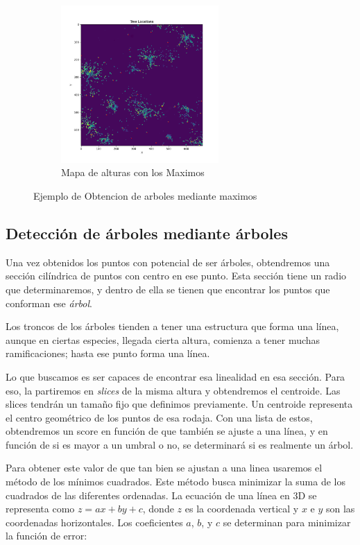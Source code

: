 \begin{figure}[h]
\begin{subfigure}[t]{.4\textwidth}
  \centering
  \includegraphics[height=6cm]{imaxes/chm_with_trees.png}
  \caption{Mapa de alturas con los Maximos}
  \label{fig:chm_max}
\end{subfigure}

\caption{Ejemplo de Obtencion de arboles mediante maximos}
\label{fig:chmexample}
\end{figure}

\subsection{Detección de árboles mediante árboles}

Una vez obtenidos los puntos con potencial de ser árboles, obtendremos una sección cilíndrica de puntos con centro en ese punto. Esta sección tiene un radio que determinaremos, y dentro de ella se tienen que encontrar los puntos que conforman ese \textit{árbol}.

Los troncos de los árboles tienden a tener una estructura que forma una línea, aunque en ciertas especies, llegada cierta altura, comienza a tener muchas ramificaciones; hasta ese punto forma una línea.

Lo que buscamos es ser capaces de encontrar esa linealidad en esa sección. Para eso, la partiremos en \textit{slices} de la misma altura y obtendremos el centroide. Las slices tendrán un tamaño fijo que definimos previamente. Un centroide representa el centro geométrico de los puntos de esa rodaja. Con una lista de estos, obtendremos un score en función de que también se ajuste a una línea, y en función de si es mayor a un umbral o no, se determinará si es realmente un árbol.


Para obtener este valor de que tan bien se ajustan a una linea usaremos el método de los mínimos cuadrados. Este método busca minimizar la suma de los cuadrados de las diferentes ordenadas. La ecuación de una línea en 3D se representa como $z = ax + by + c$, donde $z$ es la coordenada vertical y $x$ e $y$ son las coordenadas horizontales. Los coeficientes $a$, $b$, y $c$ se determinan para minimizar la función de error:

